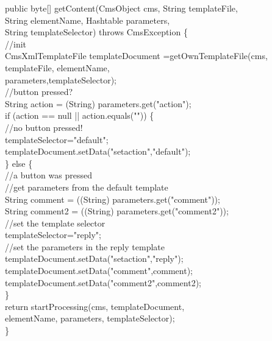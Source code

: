 \begin{java}
public byte[] getContent(CmsObject cms, String templateFile,\\
\jtabb        String elementName, Hashtable parameters,\\
\jtabb        String templateSelector) throws CmsException \{\\
\jtaba    //init\\
\jtaba        CmsXmlTemplateFile templateDocument =getOwnTemplateFile(cms,\\
\jtabc              templateFile, elementName,\\
\jtabc              parameters,templateSelector);\\
\jtaba        //button pressed?\\
\jtaba        String action = (String) parameters.get("action");\\
\jtaba        if (action == null || action.equals("")) \{\\
\jtabb              //no button pressed!\\
\jtabb              templateSelector="default";\\
\jtabb              templateDocument.setData("setaction","default");\\
\jtaba        \} else \{\\
\jtabb              //a button was pressed\\
\jtabb              //get parameters from the default template\\
\jtabb              String comment = ((String) parameters.get("comment"));\\
\jtabb              String comment2 = ((String) parameters.get("comment2"));\\
\jtabb              //set the template selector\\
\jtabb              templateSelector="reply";\\
\jtabb              //set the parameters in the reply template\\
\jtabb              templateDocument.setData("setaction","reply");\\
\jtabb              templateDocument.setData("comment",comment);\\
\jtabb              templateDocument.setData("comment2",comment2);\\
\jtaba       \}\\
\jtaba       return startProcessing(cms, templateDocument,\\
\jtabc      elementName, parameters, templateSelector);\\
\}\\
\end{java}


